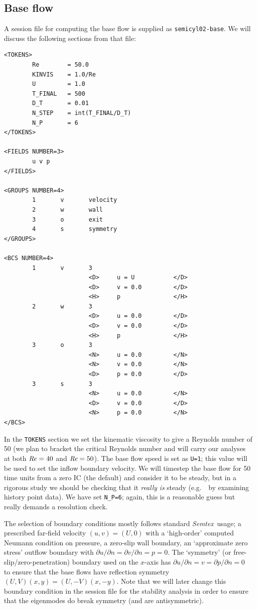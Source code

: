 \documentclass[11pt,a4paper]{report}
\newcommand\Rey{\mbox{\textit{Re}}}
\newcommand{\eg}{e.g.\ }
\newcommand{\Semtex}{\emph{Semtex}}
\begin{document}
\subsection{Base flow}

A session file for computing the base flow is supplied as
\verb+semicyl02-base+. We will discuss the following sections from
that file: {\small
\begin{verbatim}
<TOKENS>
        Re        = 50.0
        KINVIS    = 1.0/Re
        U         = 1.0
        T_FINAL   = 500
        D_T       = 0.01
        N_STEP    = int(T_FINAL/D_T)
        N_P       = 6
</TOKENS>

<FIELDS NUMBER=3>
        u v p
</FIELDS>

<GROUPS NUMBER=4>
        1       v       velocity
        2       w       wall
        3       o       exit
        4       s       symmetry
</GROUPS>

<BCS NUMBER=4>
        1       v       3
                        <D>     u = U           </D>
                        <D>     v = 0.0         </D>
                        <H>     p               </H>
        2       w       3
                        <D>     u = 0.0         </D>
                        <D>     v = 0.0         </D>
                        <H>     p               </H>
        3       o       3
                        <N>     u = 0.0         </N>
                        <N>     v = 0.0         </N>
                        <D>     p = 0.0         </D>
        3       s       3
                        <N>     u = 0.0         </N>
                        <D>     v = 0.0         </D>
                        <N>     p = 0.0         </N>
</BCS>
\end{verbatim}
} In the \verb+TOKENS+ section we set the kinematic viscosity to give
a Reynolds number of 50 (we plan to bracket the critical Reynolds
number and will carry our analyses at both $\Rey=40$ and $\Rey=50$).
The base flow speed is set as \verb+U=1+; this value will be used to
set the inflow boundary velocity.  We will timestep the base flow for
50 time units from a zero IC (the default) and consider it to be
steady, but in a rigorous study we should be checking that it
\emph{really is} steady (\eg\ by examining history point data). We
have set \verb+N_P=6+; again, this is a reasonable guess but really
demands a resolution check.

The selection of boundary conditions mostly follows standard
\Semtex\ usage; a prescribed far-field velocity $(u,v)=(U,0)$ with a
`high-order' computed Neumann condition on pressure, a zero-slip wall
boundary, an `approximate zero stress' outflow boundary with $\partial
u/\partial n=\partial v/\partial n = p = 0$.  The `symmetry' (or
free-slip/zero-penetration) boundary used on the $x$-axis has
$\partial u/\partial n=v=\partial p/\partial n=0$ to ensure that the
base flows have reflection symmetry $(U,V)(x,y)=(U,-V)(x,-y)$.  Note
that we will later change this boundary condition in the session file
for the stability analysis in order to ensure that the eigenmodes do
break symmetry (and are antisymmetric).
\end{document}
